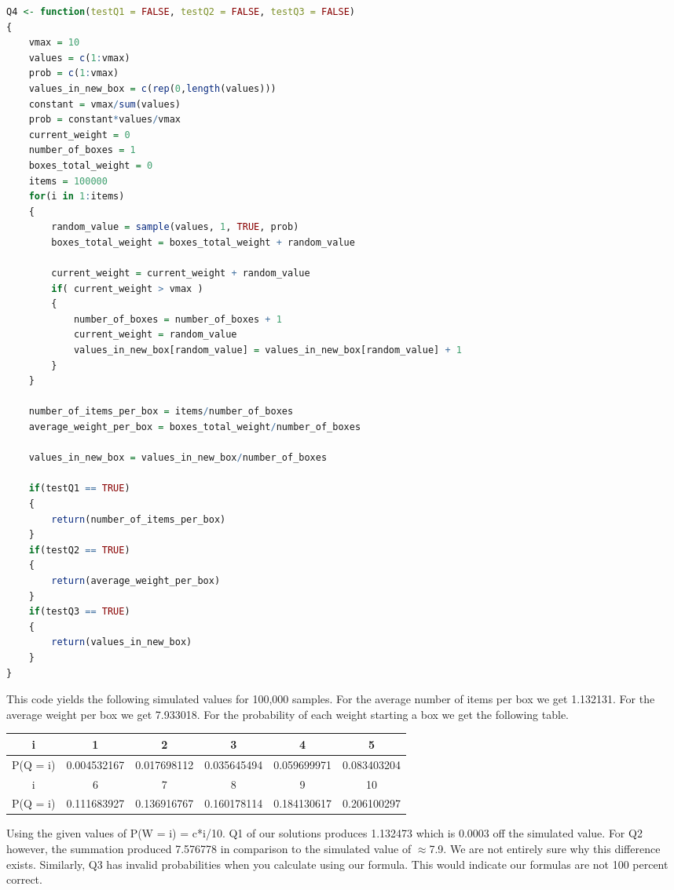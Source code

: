 \documentclass[10pt,a4paper]{article}
\begin{document}
\begin{lstlisting}[language = R]
Q4 <- function(testQ1 = FALSE, testQ2 = FALSE, testQ3 = FALSE)
{
    vmax = 10
    values = c(1:vmax)
    prob = c(1:vmax)
    values_in_new_box = c(rep(0,length(values)))
    constant = vmax/sum(values)
    prob = constant*values/vmax
    current_weight = 0
    number_of_boxes = 1
    boxes_total_weight = 0
    items = 100000
    for(i in 1:items)
    {
        random_value = sample(values, 1, TRUE, prob)
        boxes_total_weight = boxes_total_weight + random_value
       
        current_weight = current_weight + random_value
        if( current_weight > vmax )
        {
            number_of_boxes = number_of_boxes + 1
            current_weight = random_value
            values_in_new_box[random_value] = values_in_new_box[random_value] + 1
        }
    }
   
    number_of_items_per_box = items/number_of_boxes
    average_weight_per_box = boxes_total_weight/number_of_boxes
   
    values_in_new_box = values_in_new_box/number_of_boxes
   
    if(testQ1 == TRUE)
    {
        return(number_of_items_per_box)
    }
    if(testQ2 == TRUE)
    {
        return(average_weight_per_box)
    }
    if(testQ3 == TRUE)
    {
        return(values_in_new_box)
    }
}
\end{lstlisting}
This code yields the following simulated values for 100,000 samples. For the average number of items per box we get 1.132131. For the average weight per box we get 7.933018. For the probability of each weight starting a box we get the following table.
\begin{center}
\begin{tabu}{ |c|c|c|c|c|c| }
    \hline
    i & 1 & 2 & 3 & 4 & 5 \\
    \hline
    P(Q = i) & 0.004532167 & 0.017698112 & 0.035645494 & 0.059699971 & 0.083403204   \\
    \hline
    i & 6 & 7 & 8 & 9 & 10\\
    \hline
    P(Q = i) & 0.111683927 & 0.136916767 & 0.160178114 & 0.184130617 & 0.206100297 \\
    \hline
\end{tabu}
\end{center}
Using the given values of P(W = i) = c*i/10. Q1 of our solutions produces 1.132473 which is 0.0003 off the simulated value. For Q2 however, the summation produced 7.576778 in comparison to the simulated value of $\approx$7.9. We are not entirely sure why this difference exists. Similarly, Q3 has invalid probabilities when you calculate using our formula. This would indicate our formulas are not 100 percent correct.
\end{document}
